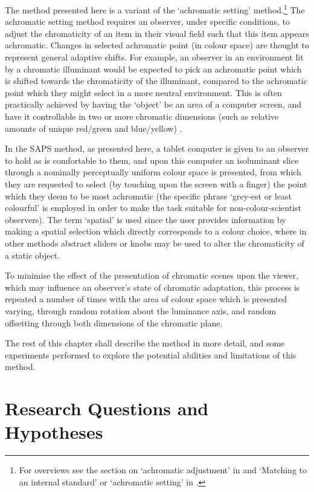The method presented here is a variant of the `achromatic setting' method.\footnote{For overviews see %
the section on `achromatic adjustment' in \citet{foster_color_2011} and `Matching to an internal standard' or `achromatic setting' in \citet{smithson_sensory_2005}.} The achromatic setting method requires an observer, under specific conditions, to adjust the chromaticity of an item in their visual field such that this item appears achromatic. Changes in selected achromatic point (in colour space) are thought to represent general adaptive shifts. For example, an observer in an environment lit by a chromatic illuminant would be expected to pick an achromatic point which is shifted towards the chromaticity of the illuminant, compared to the achromatic point which they might select in a more neutral environment. This is often practically achieved by having the `object' be an area of a computer screen, and have it controllable in two or more chromatic dimensions (such as relative amounts of unique red/green and blue/yellow) %
. 

In the \gls{SAPS} method, as presented here, a tablet computer is given to an observer to hold as is comfortable to them, and upon this computer an isoluminant slice through a nominally perceptually uniform colour space is presented, from which they are requested to select (by touching upon the screen with a finger) the point which they deem to be most achromatic (the specific phrase `grey-est or least colourful' is employed in order to make the task suitable for non-colour-scientist observers). The term `spatial' is used since the user provides information by making a spatial selection which directly corresponds to a colour choice, where in other methods abstract sliders or knobs may be used to alter the chromaticity of a static object.

To minimise the effect of the presentation of chromatic scenes upon the viewer, which may influence an observer's state of chromatic adaptation, this process is repeated a number of times with the area of colour space which is presented varying, through random rotation about the luminance axis, and random offsetting through both dimensions of the chromatic plane.

The rest of this chapter shall describe the method in more detail, and some experiments performed to explore the potential abilities and limitations of this method.

\section{Research Questions and Hypotheses} \label{sec:qandhyp}

